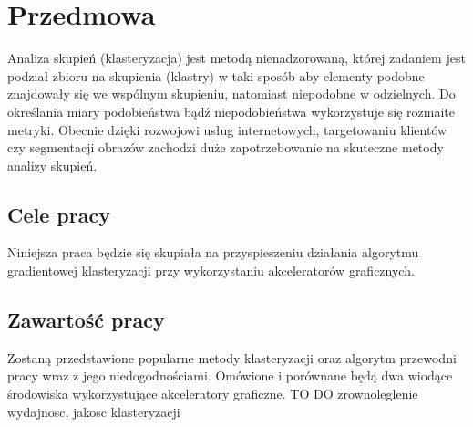 \chapter{Przedmowa}
\label{cha:przedmowa}

Analiza skupień (klasteryzacja) jest metodą nienadzorowaną, której zadaniem jest podział zbioru na skupienia (klastry) w taki sposób aby elementy podobne znajdowały się we wspólnym skupieniu, natomiast niepodobne w odzielnych. Do określania miary podobieństwa bądź niepodobieństwa wykorzystuje się rozmaite metryki. Obecnie dzięki rozwojowi usług internetowych, targetowaniu klientów czy segmentacji obrazów zachodzi duże zapotrzebowanie na skuteczne metody analizy skupień.


\section{Cele pracy}
\label{sec:celePracy}

Niniejsza praca będzie się skupiała na przyspieszeniu działania algorytmu gradientowej klasteryzacji przy wykorzystaniu akceleratorów graficznych.



\section{Zawartość pracy}
\label{sec:zawartoscPracy}

Zostaną przedstawione popularne metody klasteryzacji oraz algorytm przewodni pracy wraz z jego niedogodnościami. Omówione i porównane będą dwa wiodące środowiska wykorzystujące akceleratory graficzne.
TO DO
zrownoleglenie wydajnosc, jakosc klasteryzacji